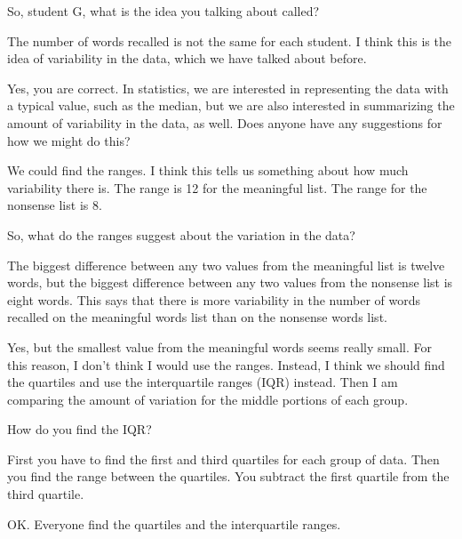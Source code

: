 {\begin{scriptlist}
      \item [Teacher:] So, student G, what is the idea you talking about called?

      \item [Student G:] The number of words recalled is not the same for each student. I think this is the idea of variability in the data, which we have talked about before.

      \item [Teacher:] Yes, you are correct. In statistics, we are interested in representing the data with a typical value, such as the median, but we are also interested in summarizing the amount of variability in the data, as well. Does anyone have any suggestions for how we might do this?

      \item [Student H:] We could find the ranges. I think this tells us something about how much variability there is. The range is 12 for the meaningful list. The range for the nonsense list is $8$.\vspace{\baselineskip}

      \item [Teacher:] So, what do the ranges suggest about the variation in the data?

      \item [Student H:] The biggest difference between any two values from the meaningful list is twelve words, but the biggest difference between any two values from the nonsense list is eight words. This says that there is more variability in the number of words recalled on the meaningful words list than on the nonsense words list.

      \item [Student I:] Yes, but the smallest value from the meaningful words seems really small. For this reason, I don't think I would use the ranges. Instead, I think we should find the quartiles and use the interquartile ranges (IQR) instead. Then I am comparing the amount of variation for the middle portions of each group.

      \item [Teacher:] How do you find the IQR?

      \item [Student I:] First you have to find the first and third quartiles for each group of data. Then you find the range between the quartiles. You subtract the first quartile from the third quartile.

      \item [Teacher:] OK. Everyone find the quartiles and the interquartile ranges.


\end{scriptlist}}
